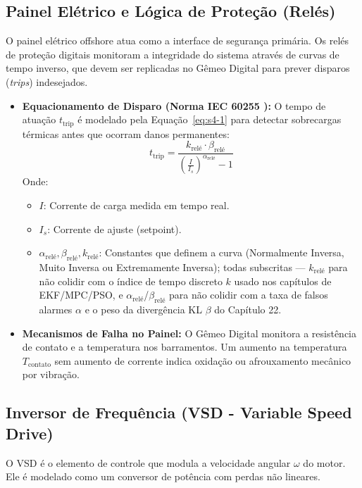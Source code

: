 \documentclass[12pt,a4paper]{article}
\numberwithin{equation}{section}
\numberwithin{table}{section}
\numberwithin{figure}{section}
\begin{document}
	\subsection{\textbf{Painel Elétrico e Lógica de Proteção (Relés)}}
	O painel elétrico offshore atua como a interface de segurança primária. Os relés de proteção digitais monitoram a integridade do sistema através de curvas de tempo inverso, que devem ser replicadas no Gêmeo Digital para prever disparos (\textit{trips}) indesejados.
	
	\begin{itemize}
		\item \textbf{Equacionamento de Disparo (Norma IEC 60255 \cite{iec60255}):}
		O tempo de atuação $t_{\text{trip}}$ é modelado pela Equação~\eqref{eq:s4-1} para detectar sobrecargas térmicas antes que ocorram danos permanentes:
		\begin{equation}\label{eq:s4-1}
 t_{\text{trip}} = \frac{k_{\text{relé}} \cdot \beta_{\text{relé}}}{\left( \frac{I}{I_s} \right)^{\alpha_{\text{relé}}} - 1}
\end{equation}
		Onde:
		\begin{itemize}
			\item $I$: Corrente de carga medida em tempo real.
			\item $I_s$: Corrente de ajuste (setpoint).
			\item $\alpha_{\text{relé}}, \beta_{\text{relé}}, k_{\text{relé}}$: Constantes que definem a curva (Normalmente Inversa, Muito Inversa ou Extremamente Inversa); todas subscritas — $k_{\text{relé}}$ para não colidir com o índice de tempo discreto $k$ usado nos capítulos de EKF/MPC/PSO, e $\alpha_{\text{relé}}$/$\beta_{\text{relé}}$ para não colidir com a taxa de falsos alarmes $\alpha$ e o peso da divergência KL $\beta$ do Capítulo 22.
		\end{itemize}
		\item \textbf{Mecanismos de Falha no Painel:} O Gêmeo Digital monitora a resistência de contato e a temperatura nos barramentos. Um aumento na temperatura $T_{\text{contato}}$ sem aumento de corrente indica oxidação ou afrouxamento mecânico por vibração.
	\end{itemize}
	
	\subsection{\textbf{Inversor de Frequência (VSD - Variable Speed Drive)}}
	O VSD é o elemento de controle que modula a velocidade angular $\omega$ do motor. Ele é modelado como um conversor de potência com perdas não lineares.
	
\end{document}
